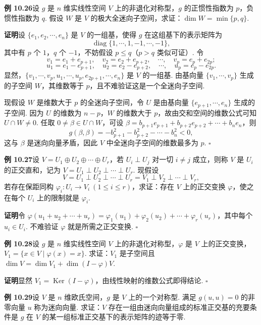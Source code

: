 \documentclass[UTF8, 12pt, fontset=fandol, oneside]{ctexart}
\begin{document}
\noindent\textbf{例 10.26}\quad 设 $g$ 是 $n$ 维实线性空间 $V$ 上的非退化对称型，$g$ 的正惯性指数为 $p$，负惯性指数为 $q$. 假设 $W$ 是 $V$ 的极大全迷向子空间，求证：$\dim W=\min\{p,q\}$.

\noindent\textbf{证明}\quad 设 $\{e_1,e_2,\cdots,e_n\}$ 是 $V$ 的一组基，使得 $g$ 在这组基下的表示矩阵为
\[
\operatorname{diag}\{1,\cdots,1,-1,\cdots,-1\},
\]
其中有 $p$ 个 $1$，$q$ 个 $-1$，不妨假设 $p\le q$（$p>q$ 类似可证）. 令
\[
v_1=e_1+e_{p+1},\quad v_2=e_2+e_{p+2},\quad \cdots,\quad v_p=e_p+e_{2p};
\]
\[
u_1=e_1-e_{p+1},\quad u_2=e_2-e_{p+2},\quad \cdots,\quad u_p=e_p-e_{2p}.
\]
显然，$\{v_1,\cdots,v_p,u_1,\cdots,u_p,e_{2p+1},\cdots,e_n\}$ 是 $V$ 的一组基. 由基向量 $\{v_1,\cdots,v_p\}$ 生成的子空间 $W$，其维数等于 $p$，且不难验证这是一个全迷向子空间.

现假设 $W$ 是维数大于 $p$ 的全迷向子空间，令 $U$ 是由基向量 $\{e_{p+1},\cdots,e_n\}$ 生成的子空间. 因为 $U$ 的维数为 $n-p$，$W$ 的维数大于 $p$，故由交和空间的维数公式可知 $U\cap W\ne0$. 任取 $0\ne\beta\in U\cap W$，可设 $\beta=b_{p+1}e_{p+1}+b_{p+2}e_{p+2}+\cdots+b_ne_n$，则
\[
g(\beta,\beta)=-b_{p+1}^2-b_{p+2}^2-\cdots-b_n^2<0,
\]
这与 $\beta$ 是迷向向量矛盾，因此 $V$ 中全迷向子空间的维数最多为 $p$. $\square$

\noindent\textbf{例 10.27}\quad 设 $V=U_1\oplus U_2\oplus\cdots\oplus U_r$，若 $U_i\perp U_j$ 对一切 $i\ne j$ 成立，则称 $V$ 是 $U_i$ 的正交直和，记为 $V=U_1\perp U_2\perp\cdots\perp U_r$. 现假设
\[
V=U_1\perp U_2\perp\cdots\perp U_r=V_1\perp V_2\perp\cdots\perp V_r,
\]
若存在保距同构 $\varphi_i:U_i\to V_i\ (1\le i\le r)$，求证：存在 $V$ 上的正交变换 $\varphi$，使之在每个 $U_i$ 上的限制就是 $\varphi_i$.

\noindent\textbf{证明}\quad 令 $\varphi(u_1+u_2+\cdots+u_r)=\varphi_1(u_1)+\varphi_2(u_2)+\cdots+\varphi_r(u_r)$，其中每个 $u_i\in U_i$. 不难验证 $\varphi$ 就是所需之正交变换. $\square$

\noindent\textbf{例 10.28}\quad 设 $g$ 是 $n$ 维实线性空间 $V$ 上的非退化对称型，$\varphi$ 是 $V$ 上的正交变换，$V_1=\{x\in V\mid \varphi(x)=x\}$. 求证：$V_1$ 是子空间且 $\dim V=\dim V_1+\dim(I-\varphi)V$.

\noindent\textbf{证明}\quad 显然 $V_1=\operatorname{Ker}(I-\varphi)$，由线性映射的维数公式即得结论. $\square$

\noindent\textbf{例 10.29}\quad 设 $V$ 是 $n$ 维欧氏空间，$g$ 是 $V$ 上的一个对称型. 满足 $g(u,u)=0$ 的非零向量 $u$ 称为迷向向量. 求证：$V$ 存在一组由迷向向量组成的标准正交基的充要条件是 $g$ 在 $V$ 的某一组标准正交基下的表示矩阵的迹等于零.
\end{document}
